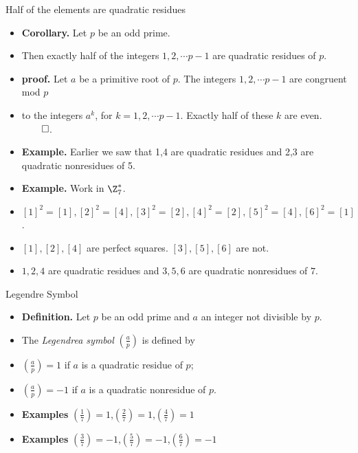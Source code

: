 \documentclass{beamer}
\begin{document}
\begin{frame}{Half of the elements are quadratic residues}

\begin{itemize}
  \item \textbf{Corollary.} Let $p$ be an odd prime.
  \item Then exactly half of the integers $1,2,\cdots p-1$ are quadratic residues of $p$.
  \item \textbf{proof.} Let $a$ be a primitive root of $p$. The integers $1,2,\cdots p-1$ are congruent mod $p$
  \item to the integers $a^k$, for $k=1,2,\cdots p-1$. Exactly half of these $k$ are even. $\qed$.
  \item \textbf{Example.} Earlier we saw that 1,4 are quadratic residues and 2,3 are quadratic nonresidues of 5.
  \item \textbf{Example.} Work in $\Z^*_7$.
  \item $[1]^2=[1], [2]^2=[4], [3]^2=[2], [4]^2 = [2], [5]^2=[4], [6]^2=[1]$.
  \item $[1],[2],[4]$ are perfect squares. $[3],[5],[6]$ are not.
  \item $1,2,4$ are quadratic residues and $3,5,6$ are quadratic nonresidues of $7$.
\end{itemize}

\end{frame}

\begin{frame}{Legendre Symbol}

\begin{itemize}
  \item \textbf{Definition.} Let $p$ be an odd prime and $a$ an integer not divisible by $p$.
  \item The \emph{Legendrea symbol} $(\frac{a}{p})$ is defined by
  \item $(\frac{a}{p}) = 1$ if $a$ is a quadratic residue of $p$;
  \item $(\frac{a}{p}) = -1$ if $a$ is a quadratic nonresidue of $p$.
  \item \textbf{Examples} $(\frac{1}{7}) = 1$,$(\frac{2}{7}) = 1$,$(\frac{4}{7}) = 1$
  \item \textbf{Examples} $(\frac{3}{7}) = -1$,$(\frac{5}{7}) = -1$,$(\frac{6}{7}) = -1$
\end{itemize}

\end{frame}
\end{document}
